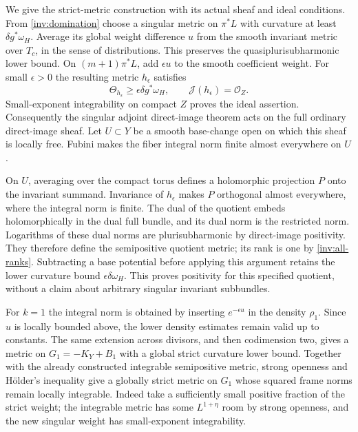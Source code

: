 We give the strict-metric construction with its actual sheaf and ideal
conditions.  From \eqref{inv:domination} choose a singular metric on
$\pi^*L$ with curvature at least $\delta g^*\omega_H$.
Average its global weight difference $u$ from the smooth invariant
metric over $T_c$, in the sense of distributions.  This preserves the
quasiplurisubharmonic lower bound.  On $(m+1)\pi^*L$, add
$\epsilon u$ to the smooth coefficient weight.  For small
$\epsilon>0$ the resulting metric $h_\epsilon$ satisfies
\[
 \Theta_{h_\epsilon}\ge\epsilon\delta g^*\omega_H,
 \qquad\mathcal J(h_\epsilon)=\mathcal O_Z.
\]
Small-exponent integrability on compact $Z$ proves the ideal assertion.
Consequently the singular adjoint direct-image theorem
\cite[Theorem~3.3.5]{PT2018} acts on the full ordinary direct-image
sheaf.  Let $U\subset Y$ be a smooth base-change open on which this
sheaf is locally free.  Fubini makes the fiber integral norm finite
almost everywhere on $U$.

On $U$, averaging over the compact torus defines a holomorphic
projection $P$ onto the invariant summand.  Invariance of
$h_\epsilon$ makes $P$ orthogonal almost everywhere, where the integral
norm is finite.  The dual of the quotient embeds holomorphically in the
dual full bundle, and its dual norm is the restricted norm.  Logarithms
of these dual norms are plurisubharmonic by direct-image positivity.
They therefore define the semipositive quotient metric; its rank is
one by \eqref{inv:all-ranks}.  Subtracting a base potential before
applying this argument retains the lower curvature bound
$\epsilon\delta\omega_H$.  This proves positivity for this specified
quotient, without a claim about arbitrary singular invariant subbundles.

For $k=1$ the integral norm is obtained by inserting $e^{-\epsilon u}$
in the density $\rho_1$.  Since $u$ is locally bounded above, the
lower density estimates remain valid up to constants.  The same
extension across divisors, and then codimension two, gives a metric on
$G_1=-K_Y+B_1$ with a global strict curvature lower bound.
Together with the already constructed integrable semipositive metric,
strong openness and H\"older's inequality give a globally strict
metric on $G_1$ whose squared frame norms remain locally integrable.
Indeed take a sufficiently small positive fraction of the strict
weight; the integrable metric has some $L^{1+\eta}$ room by strong
openness, and the new singular weight has small-exponent integrability.

